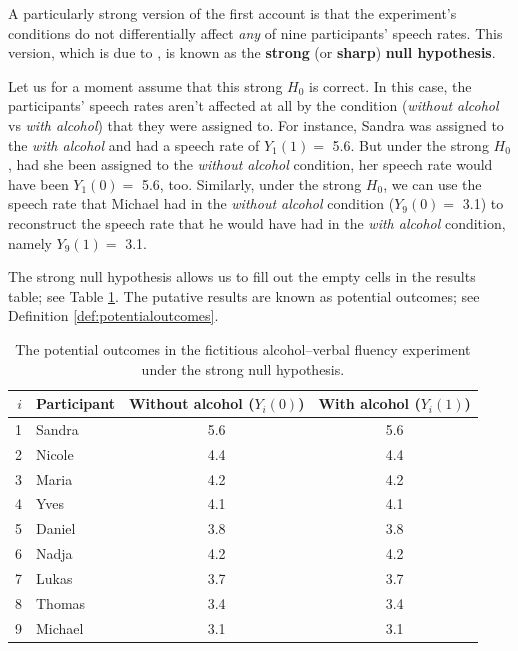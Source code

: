 \documentclass[a4paper]{tufte-book}\usepackage[]{graphicx}\usepackage[]{xcolor}
\newcommand{\term}[1]{\textbf{#1}}
\begin{document}
A particularly strong version of the first account is that the experiment's 
conditions do not differentially affect \emph{any} of nine participants'
speech rates.
This version, which is due to \citet{Fisher1935}, is known as the 
\term{strong} (or \term{sharp}) \term{null hypothesis}.

Let us for a moment assume that this strong $H_0$ is correct.
In this case, the participants' speech rates aren't affected at all by the
condition (\textit{without alcohol} vs \textit{with alcohol}) that they
were assigned to.
For instance, 
Sandra was assigned to the \textit{with alcohol} 
and had a speech rate of $Y_1(1)=$ 5.6.
But under the strong $H_0$, had she been assigned to the \textit{without alcohol}
condition, her speech rate would have been $Y_1(0)=$ 5.6, too.
Similarly, under the strong $H_0$, 
we can use the speech rate that Michael had in the \textit{without alcohol} 
condition ($Y_{9}(0) =$ 3.1) to reconstruct the speech rate that he would
have had in the \textit{with alcohol} condition, namely $Y_{9}(1)=$ 3.1.

The strong null hypothesis allows us to fill out the empty cells
in the results table; see Table \ref{tab:potentialoutcomes}.
The putative results are known as potential outcomes; see Definition
\vref{def:potentialoutcomes}.

\begin{table}
\caption{The potential outcomes in the fictitious alcohol--verbal fluency experiment 
under the strong null hypothesis.}
\centering
\begin{tabular}{@{}rlcc@{}}
\toprule
  $i$ & Participant & Without alcohol ($Y_i(0)$)  & With alcohol ($Y_i(1)$) \\
  \midrule
  1 & Sandra        & 5.6                         & 5.6 \\
  2 & Nicole        & 4.4                         & 4.4 \\
  3 & Maria         & 4.2                         & 4.2 \\
  4 & Yves          & 4.1                         & 4.1 \\
  5 & Daniel        & 3.8                         & 3.8 \\
  6 & Nadja         & 4.2                         & 4.2 \\
  7 & Lukas         & 3.7                         & 3.7 \\
  8 & Thomas        & 3.4                         & 3.4 \\
  9 & Michael       & 3.1                         & 3.1 \\
\bottomrule
\end{tabular}
\label{tab:potentialoutcomes}
\end{table}
\end{document}
